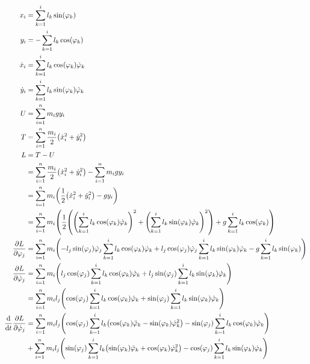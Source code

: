 \documentclass{article}
\renewcommand{\phi}{\varphi}
\begin{document}
\begin{align*}
  x_i &= \sum_{k=1}^i l_k \sin(\phi_k) \\
  y_i &= - \sum_{k=1}^i l_k \cos(\phi_k) \\
  \dot x_i &= \sum_{k=1}^i l_k \cos(\phi_k) \dot\phi_k \\
  \dot y_i &= \sum_{k=1}^i l_k \sin(\phi_k) \dot\phi_k \\
  U &= \sum_{i=1}^n m_i g y_i \\
  T &= \sum_{i=1}^n \frac{m_i}{2} \pqty{\dot x_i^2 + \dot y_i^2} \\
  L &= T - U \\
    &= \sum_{i=1}^n \frac{m_i}{2} \pqty{\dot x_i^2 + \dot y_i^2} - \sum_{i=1}^n m_i g y_i \\
    &= \sum_{i=1}^n m_i \pqty{\frac{1}{2} \pqty{\dot x_i^2 + \dot y_i^2} - g y_i} \\
    &= \sum_{i=1}^n m_i \pqty{\frac{1}{2} \pqty{{\pqty{\sum_{k=1}^i l_k \cos(\phi_k) \dot\phi_k}}^2 + {\pqty{\sum_{k=1}^i l_k \sin(\phi_k) \dot\phi_k}}^2} + g \sum_{k=1}^i l_k \cos(\phi_k)} \\
  \pdv{L}{\phi_j} &= \sum_{i=1}^n m_i \pqty{-l_j \sin(\phi_j) \dot\phi_j \sum_{k=1}^i l_k \cos(\phi_k) \dot\phi_k + l_j \cos(\phi_j) \dot\phi_j \sum_{k=1}^i l_k \sin(\phi_k) \dot\phi_k - g \sum_{k=1}^i l_k \sin(\phi_k)} \\
  \pdv{L}{\dot\phi_j} &= \sum_{i=1}^n m_i \pqty{l_j \cos(\phi_j) \sum_{k=1}^i l_k \cos(\phi_k) \dot\phi_k + l_j \sin(\phi_j) \sum_{k=1}^i l_k \sin(\phi_k) \dot\phi_k} \\
                      &= \sum_{i=1}^n m_i l_j \pqty{\cos(\phi_j) \sum_{k=1}^i l_k \cos(\phi_k) \dot\phi_k + \sin(\phi_j) \sum_{k=1}^i l_k \sin(\phi_k) \dot\phi_k} \\
  \dv{t} \pdv{L}{\dot\phi_j} &= \sum_{i=1}^n m_i l_j \pqty{\cos(\phi_j) \sum_{k=1}^i l_k \pqty{\cos(\phi_k) \ddot\phi_k - \sin(\phi_k) \dot\phi_k^2} - \sin(\phi_j) \sum_{k=1}^i l_k \cos(\phi_k) \dot\phi_k} \\
                             &+ \sum_{i=1}^n m_i l_j \pqty{\sin(\phi_j) \sum_{k=1}^i l_k \pqty{\sin(\phi_k) \ddot\phi_k + \cos(\phi_k) \dot\phi_k^2} - \cos(\phi_j) \sum_{k=1}^i l_k \sin(\phi_k) \dot\phi_k} \\
\end{align*}
\end{document}
